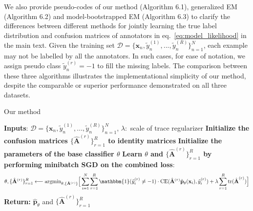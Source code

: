 We also provide pseudo-codes of our method (Algorithm 6.1), generalized EM \cite{raykar2009supervised} (Algorithm 6.2) and model-bootstrapped EM \cite{khetan2017learning} (Algorithm 6.3) to clarify the differences between different methods for jointly learning the true label distribution and confusion matrices of annotators in eq.~\eqref{eq:model_likelihood} in the main text. Given the training set $\mathcal{D} = \{\textbf{x}_n, \tilde{y}^{(1)}_{n},...,\tilde{y}^{(R)}_{n}\}_{n=1}^{N}$, each example may not be labelled by all the annotators. In such cases, for ease of notation, we assign pseudo class $\tilde{y}^{(r)}_{n}=-1$ to fill the missing labels. The comparison between these three algorithms illustrates the implementational simplicity of our method, despite the comparable or superior performance demonstrated on all three datasets. 

\begin{algorithm}
	\caption{Our method}
	\label{alg:ourmethod}
		\footnotesize
	\begin{algorithmic}
		\State \textbf{Inputs}: $\mathcal{D} = \{\textbf{x}_n, \tilde{y}^{(1)}_{n},...,\tilde{y}^{(R)}_{n}\}_{n=1}^{N}$,
		$\lambda:$ scale of trace regularizer
		\State \textbf{Initialize the confusion matrices $\{\hat{\mathbf{A}}^{(r)}\}_{r=1}^{R}$ to identity matrices}
		\State \textbf{Initialize the parameters of the base classifier $\theta$}
		\State \textbf{Learn $\theta$ and $\{\hat{\mathbf{A}}^{(r)}\}_{r=1}^{R}$ by performing minibatch SGD on the combined loss}:
		\vspace{-2mm}
		$$\theta, \{\hat{\mathbf{A}}^{(r)}\}_{r=1}^{R} \longleftarrow \text{argmin}_{\theta, \{\hat{\mathbf{A}}^{(r)}\}} \Big{[}\sum_{i=1}^{N}\sum_{r=1}^{R} \mathbbm{1}(\tilde{y}_{i}^{(r)} \neq -1)\cdot \text{CE}(\hat{\mathbf{A}}^{(r)}\hat{\textbf{p}}_{\theta}(\mathbf{x}_i), \tilde{y}^{(r)}_{i})  + \lambda \sum_{r=1}^{R}\text{tr}(\hat{\textbf{A}}^{(r)}) \Big{]}$$ 
		\vspace{-3mm}
		\State \textbf{Return:   } $\hat{\mathbf{p}}_{\theta}$ and $\{\hat{\mathbf{A}}^{(r)}\}_{r=1}^R$
	\end{algorithmic}
\end{algorithm}

